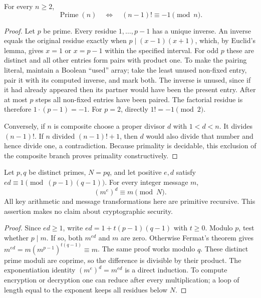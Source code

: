 \begin{theorem}\label{el:wilson}
For every $n\ge2$,
\[
 \operatorname{Prime}(n)\quad\Longleftrightarrow\quad
 (n-1)!\equiv-1\pmod n.
\]
\end{theorem}
\begin{proof}
Let $p$ be prime.  Every residue $1,\ldots,p-1$ has a unique inverse.
An inverse equals the original residue exactly when
$p\mid(x-1)(x+1)$, which, by Euclid's lemma, gives $x=1$ or $x=p-1$
within the specified interval.  For odd $p$ these are distinct and
all other entries form pairs with product one.  To make the pairing
literal, maintain a Boolean ``used'' array; take the least unused
non-fixed entry, pair it with its computed inverse, and mark both.
The inverse is unused, since if it had already appeared then its
partner would have been the present entry.  After at most $p$ steps
all non-fixed entries have been paired.  The factorial residue is
therefore $1\cdot(p-1)=-1$.  For $p=2$, directly $1!=-1\pmod2$.

Conversely, if $n$ is composite choose a proper divisor $d$ with
$1<d<n$.  It divides $(n-1)!$.  If $n$ divided $(n-1)!+1$, then $d$
would also divide that number and hence divide one, a contradiction.
Because primality is decidable, this exclusion of the composite branch
proves primality constructively.
\end{proof}

\begin{theorem}\label{el:rsa}
Let $p,q$ be distinct primes, $N=pq$, and let positive $e,d$ satisfy
$ed\equiv1\pmod{(p-1)(q-1)}$.  For every integer message $m$,
\[
                    (m^e)^d\equiv m\pmod N.
\]
All key arithmetic and message transformations here are primitive
recursive.  This assertion makes no claim about cryptographic security.
\end{theorem}
\begin{proof}
Since $ed\ge1$, write $ed=1+t(p-1)(q-1)$ with $t\ge0$.
Modulo $p$, test whether $p\mid m$.  If so, both $m^{ed}$ and $m$
are zero.  Otherwise Fermat's theorem gives
$m^{ed}=m(m^{p-1})^{t(q-1)}\equiv m$.  The same proof works modulo
$q$.  These distinct prime moduli are coprime, so the difference is
divisible by their product.  The exponentiation identity
$(m^e)^d=m^{ed}$ is a direct induction.  To compute encryption or
decryption one can reduce after every multiplication; a loop of
length equal to the exponent keeps all residues below $N$.
\end{proof}

